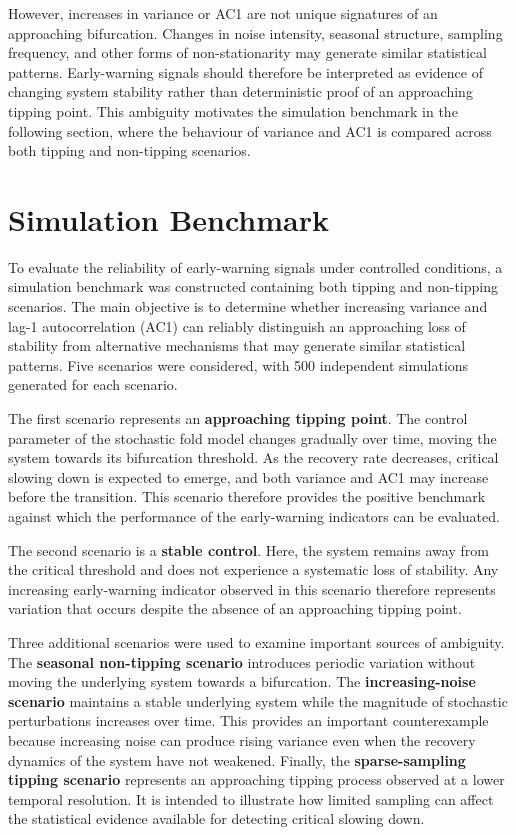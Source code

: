 \documentclass[
]{krantz}
\begin{document}
However, increases in variance or AC1 are not unique signatures of an approaching bifurcation. Changes in noise intensity, seasonal structure, sampling frequency, and other forms of non-stationarity may generate similar statistical patterns. Early-warning signals should therefore be interpreted as evidence of changing system stability rather than deterministic proof of an approaching tipping point. This ambiguity motivates the simulation benchmark in the following section, where the behaviour of variance and AC1 is compared across both tipping and non-tipping scenarios.

\section{Simulation Benchmark}\label{simulation-benchmark}

To evaluate the reliability of early-warning signals under controlled conditions, a simulation benchmark was constructed containing both tipping and non-tipping scenarios. The main objective is to determine whether increasing variance and lag-1 autocorrelation (AC1) can reliably distinguish an approaching loss of stability from alternative mechanisms that may generate similar statistical patterns. Five scenarios were considered, with 500 independent simulations generated for each scenario.

The first scenario represents an \textbf{approaching tipping point}. The control parameter of the stochastic fold model changes gradually over time, moving the system towards its bifurcation threshold. As the recovery rate decreases, critical slowing down is expected to emerge, and both variance and AC1 may increase before the transition. This scenario therefore provides the positive benchmark against which the performance of the early-warning indicators can be evaluated.

The second scenario is a \textbf{stable control}. Here, the system remains away from the critical threshold and does not experience a systematic loss of stability. Any increasing early-warning indicator observed in this scenario therefore represents variation that occurs despite the absence of an approaching tipping point.

Three additional scenarios were used to examine important sources of ambiguity. The \textbf{seasonal non-tipping scenario} introduces periodic variation without moving the underlying system towards a bifurcation. The \textbf{increasing-noise scenario} maintains a stable underlying system while the magnitude of stochastic perturbations increases over time. This provides an important counterexample because increasing noise can produce rising variance even when the recovery dynamics of the system have not weakened. Finally, the \textbf{sparse-sampling tipping scenario} represents an approaching tipping process observed at a lower temporal resolution. It is intended to illustrate how limited sampling can affect the statistical evidence available for detecting critical slowing down.
\end{document}
